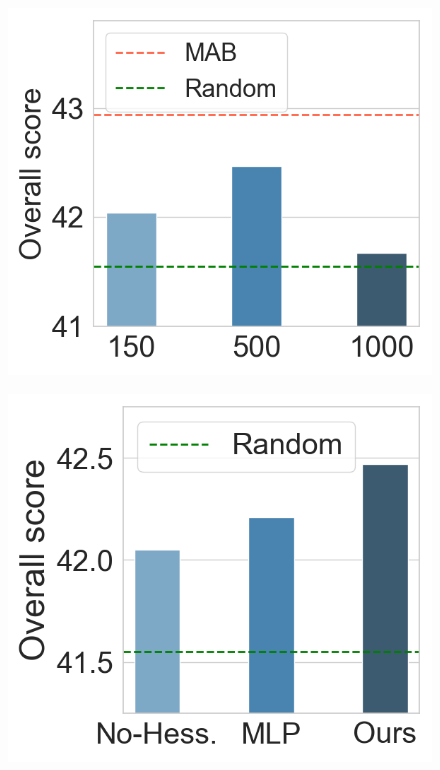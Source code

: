 \documentclass{article} %
\begin{document}



\begin{figure}
  \begin{minipage}[t]{0.25\linewidth}
    \centering
    \includegraphics[scale=0.23]{exp-fig1.png}
    \label{experiment-fig1}
  \end{minipage}%
  \begin{minipage}[t]{0.25\linewidth}
    \centering
    \includegraphics[scale=0.23]{exp-fig2.png}

\end{minipage}
\end{figure}
\end{document}
